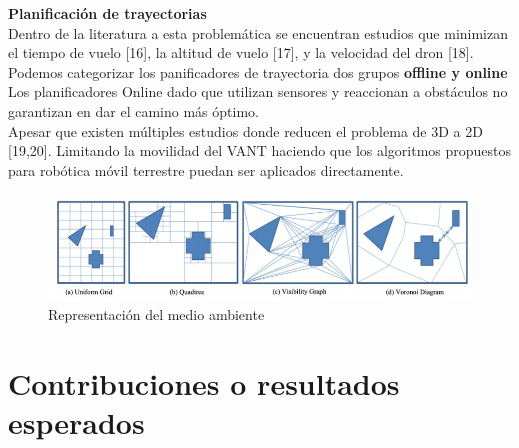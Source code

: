 \documentclass[
	11pt, %
]{beamer}
\begin{document}

\begin{frame}
  \textbf{Planificación de trayectorias}\\
         {\footnotesize
  Dentro de la literatura a esta problemática se encuentran estudios que minimizan el tiempo de vuelo [16], la altitud de vuelo [17], y la velocidad del dron [18]. Podemos categorizar los panificadores de trayectoria dos grupos \textbf{offline y online}\\
  Los planificadores Online dado que utilizan sensores y reaccionan a obstáculos no garantizan en dar el camino más óptimo.\\

  Apesar que existen múltiples estudios donde reducen el problema de 3D a 2D [19,20]. Limitando la movilidad del VANT haciendo que los algoritmos propuestos para robótica móvil terrestre puedan ser aplicados directamente. 
  }
  \begin{figure}
    \includegraphics[width=0.8\linewidth]{maps.png}
    \caption{Representación del medio ambiente}
  \end{figure}
  
\end{frame}


  


\section{Contribuciones o resultados esperados}
\end{document}
